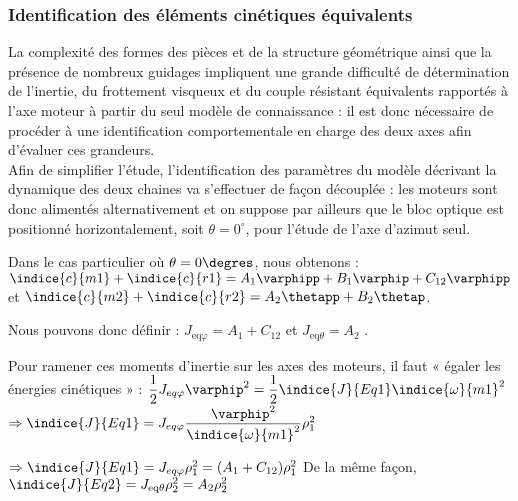 \subsubsection{Identification des éléments cinétiques équivalents}
\ifprof
\else
La complexité des formes des pièces et de la structure géométrique ainsi que la présence de nombreux guidages impliquent une grande difficulté de détermination de l'inertie, du frottement visqueux et du couple résistant équivalents rapportés à l'axe moteur à partir du seul modèle de connaissance : il est donc nécessaire de procéder à une identification comportementale en charge des deux axes afin d'évaluer ces grandeurs.\\
Afin de simplifier l'étude, l'identification des paramètres du modèle décrivant la dynamique des deux chaines va s'effectuer de façon découplée : les moteurs sont donc alimentés alternativement et on suppose par ailleurs que le bloc optique est positionné horizontalement, soit $\theta=0^{\circ}$, pour l'étude de l'axe d'azimut seul.\\
\fi
\ifprof
\begin{corrige}
Dans le cas particulier où $\theta=0\degres$, nous obtenons :
$\indice{c}{m1} +\indice{c}{r1} =A_1 \varphipp +B_1 \varphip + C_{12} \varphipp$   et  $\indice{c}{m2}+\indice{c}{r2}=A_2 \thetapp + B_2 \thetap$.

Nous pouvons donc définir : $J_{\text{eq} \varphi}=A_1  +C_{12}$ et $J_{\text{eq} \theta}=A_2$ .

Pour ramener ces moments d’inertie sur les axes des moteurs, il faut « égaler les énergies cinétiques » :
$\dfrac{1}{2} {J}_{eq\varphi} \varphip^2 = \dfrac{1}{2}\indice{J}{Eq1}\indice{\omega}{m1}^2$
$\Rightarrow \indice{J}{Eq1} = {J}_{eq\varphi}\dfrac{\varphip^2}{\indice{\omega}{m1}^2} \rho_1^2$

$\Rightarrow   \indice{J}{Eq1} = {J}_{eq\varphi} \rho_1^2=(A_1  +C_{12} )\rho_1^2$
De la même façon, $\indice{J}{Eq2} ={J}_{\text{eq} \theta}\rho_2^2 =A_2 \rho_2^2$


\end{corrige}
\else
\fi

